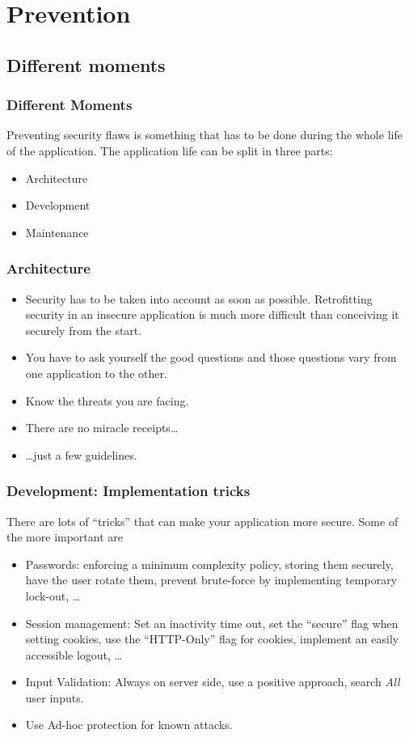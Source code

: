 \section{Prevention}
\subsection{Different moments}
\begin{frame}
\frametitle{Different Moments}

Preventing security flaws is something that has to be done during the
whole life of the application. The application life can be split in
three parts:

\begin{itemize}
\item Architecture
\item Development
\item Maintenance
\end{itemize}
\end{frame}

\begin{frame}
\frametitle{Architecture}
\begin{itemize}
\item Security has to be taken into account as soon as
  possible. Retrofitting security in an insecure application is much
  more difficult than conceiving it securely from the start.
\item You have to ask yourself the good questions and those questions
  vary from one application to the other.
\item Know the threats you are facing.
\item There are no miracle receipts\ldots
\item \ldots just a few guidelines.
\end{itemize}
\end{frame}

\begin{frame}
\frametitle{Development: Implementation tricks}

There are lots of ``tricks'' that can make your application more
secure. Some of the more important are

\begin{itemize}
\item Passwords: enforcing a minimum complexity policy, storing them
  securely, have the user rotate them, prevent brute-force by
  implementing temporary lock-out, \ldots
\item Session management: Set an inactivity time out, set the
  ``secure'' flag when setting cookies, use the ``HTTP-Only'' flag for
  cookies, implement an easily accessible logout, \ldots
\item Input Validation: Always on server side, use a positive
  approach, search \emph{All} user inputs.
\item Use Ad-hoc protection for known attacks.
\end{itemize}
\end{frame}


